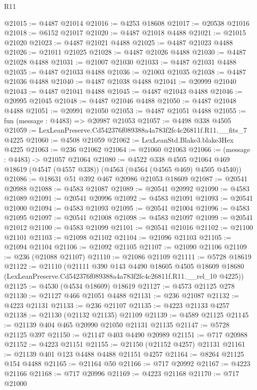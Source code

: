\begin{lexlean}{R11}
\begin{coremodule}
@21015 := @4487 @21014
@21016 := @4253 @18608
@21017 := @20538 @21016
@21018 := @6152 @21017
@21020 := @4487 @21018 @4488
@21021 := @21015 @21020
@21023 := @4487 @21021 @4488
@21025 := @4487 @21023 @4488
@21026 := @21011 @21025
@21028 := @4487 @21026 @4488
@21030 := @4487 @21028 @4488
@21031 := @21007 @21030
@21033 := @4487 @21031 @4488
@21035 := @4487 @21033 @4488
@21036 := @21003 @21035
@21038 := @4487 @21036 @4488
@21040 := @4487 @21038 @4488
@21041 := @20999 @21040
@21043 := @4487 @21041 @4488
@21045 := @4487 @21043 @4488
@21046 := @20995 @21045
@21048 := @4487 @21046 @4488
@21050 := @4487 @21048 @4488
@21051 := @20991 @21050
@21053 := @4487 @21051 @4488
@21055 := fun (message : @4483) => @20987 @21053
@21057 := @4498 @338 @4505
@21059 := LexLeanPreserve.Cd542376f089388a4a783f2fc4c26811f.R11.__fits_7 @4225
@21060 := @4508 @21059
@21062 := LexLeanStd.Blake3.blake3Hex @4225
@21063 := @236 @21062
@21064 := @21060 @21063
@21066 := (message : @4483) -> @21057 @21064
@21080 := @4522
    @338
    @4505
    @21064
    @469
    @18619
    (@4547 (@4557 @338))
    (@4563 (@4564 (@4565 @469) @4505 @4540))
@21086 := @18631 @51 @392 @467 @20986 @21053 @18609
@21087 := @20541 @20988
@21088 := @4583 @21087
@21089 := @20541 @20992
@21090 := @4583 @21089
@21091 := @20541 @20996
@21092 := @4583 @21091
@21093 := @20541 @21000
@21094 := @4583 @21093
@21095 := @20541 @21004
@21096 := @4583 @21095
@21097 := @20541 @21008
@21098 := @4583 @21097
@21099 := @20541 @21012
@21100 := @4583 @21099
@21101 := @20541 @21016
@21102 := @21100 @21101
@21103 := @21098 @21102
@21104 := @21096 @21103
@21105 := @21094 @21104
@21106 := @21092 @21105
@21107 := @21090 @21106
@21109 := @236 (@21088 @21107)
@21110 := @21086 @21109
@21111 := @5728 @18619
@21122 := @21110
    (@21111
      @390
      @143
      @4490
      @18605
      @4505
      @18609
      @18680
      (LexLeanPreserve.Cd542376f089388a4a783f2fc4c26811f.R11.__rel_10 @4225))
@21125 := @4530 (@4534 @18609) @18619
@21127 := @4573 @21125 @278
@21130 := @21127 @466 @21051 @4488
@21131 := @236 @21087
@21132 := @4223 @21131
@21133 := @236 @21107
@21135 := @4223 @21133 @4257
@21138 := @21130 (@21132 @21135) @21109
@21139 := @4589 @21125
@21145 := @21139 @404 @465 @20990 @21050 @21131 @21135
@21147 := @5728 @21125 @397
@21150 := @21147 @403 @4490 @20989
@21151 := @717 @20988
@21152 := @4223 @21151
@21155 := @21150 (@21152 @4257) @21131
@21161 := @21139 @401 @123 @4488 @4488 @21151 @4257
@21164 := @8264 @21125 @154 @4488
@21165 := @21164 @50
@21166 := @717 @20992
@21167 := @4223 @21166
@21168 := @717 @20996
@21169 := @4223 @21168
@21170 := @717 @21000

\end{coremodule}
\end{lexlean}
